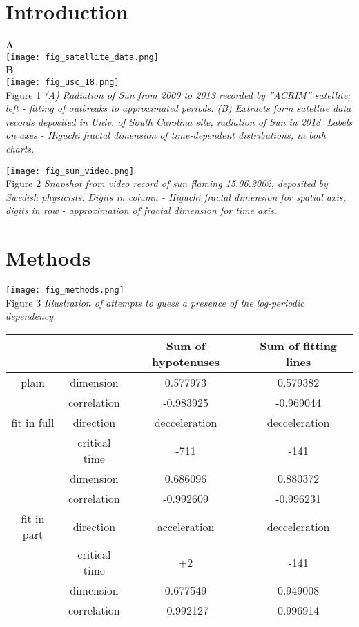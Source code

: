 \documentclass[a4paper]{article}
\begin{document}
\begin{center}
{\Large{}}
\vskip 5pt
\end{center}

\section*{Introduction}

{\large{\textbf{A}}}\\
\texttt{[image: fig\_satellite\_data.png]}\\
{\large{\textbf{B}}}\\
\texttt{[image: fig\_usc\_18.png]}\\
Figure 1 \textit{(A) Radiation of Sun from 2000 to 2013 recorded by ''ACRIM'' satellite; left - fitting of outbreaks to approximated periods. (B) Extracts form satellite data records deposited in Univ. of South Carolina site, radiation of Sun in 2018. Labels on axes - Higuchi fractal dimension of time-dependent distributions, in both charts.}

\texttt{[image: fig\_sun\_video.png]}\\
Figure 2 \textit{Snapshot from video record of sun flaming 15.06.2002, deposited by Swedish physicists. Digits in column - Higuchi fractal dimension for spatial axis, digits in row - approximation of fractal dimension for time axis. }

\section*{Methods}

\texttt{[image: fig\_methods.png]}\\

Figure 3 \textit{Illustration of attempts to guess a presence of the log-periodic dependency.}

\begin{tabular}{cccc}
\hline
 & & Sum of hypotenuses & Sum of fitting lines \\
\hline
 plain& dimension & 0.577973 & 0.579382 \\
 & correlation & -0.983925 & -0.969044 \\
\hline
fit in full & direction& decceleration & decceleration \\
    & critical time& -711 &-141 \\
    & dimension & 0.686096 & 0.880372 \\
    & correlation & -0.992609 & -0.996231 \\
\hline
fit in part & direction & acceleration & decceleration \\
    & critical time &+2 &-141 \\
    & dimension & 0.677549 & 0.949008 \\
    & correlation & -0.992127 & 0.996914 \\
\hline
\end{tabular}
\end{document}
